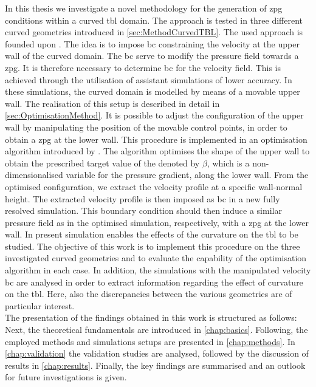 In this thesis we investigate a  novel methodology for the generation of \acrshort{zpg} conditions within a curved \acrshort{tbl} domain.
The approach is tested in three different curved geometries introduced in \autoref{sec:MethodCurvedTBL}.
The used approach is founded upon \citet{schlatter_leveraging_2025}.
The idea is to impose \acrlong{bc} constraining the velocity at the upper wall of the curved domain.  The \acrlong{bc}   serve to modify the pressure field towards a \acrlong{zpg}.
It is therefore necessary to determine \acrshort{bc} for the velocity field. 
This is achieved through the utilisation of assistant simulations of lower accuracy. 
In these simulations, the curved domain is modelled by means of a movable upper wall. 
The realisation of this setup is described in detail in \autoref{sec:OptimisationMethod}.
It is possible to adjust the configuration of the upper wall by manipulating the position of the movable control points,
 in order to obtain a \acrshort{zpg} at the lower wall.
This procedure is implemented in an optimisation algorithm introduced by \citet{morita_applying_2022}.
The algorithm optimises the shape of the upper wall to obtain the prescribed target value of the denoted by $\beta$, which is a non-dimensionalised variable for the pressure gradient, along the lower wall.
From the optimised configuration, we extract the velocity profile at a specific wall-normal height.
The extracted velocity profile is then imposed as \acrshort{bc} in a new fully resolved simulation.
This boundary condition should then induce a similar pressure field as in the optimised simulation, respectively, with a \acrlong{zpg} at the lower wall.
In present simulation enables the effects of the curvature on the \acrshort{tbl} to be studied.
The objective of this work is to implement this procedure on the three investigated curved geometries and to evaluate the capability of the optimisation algorithm in each case.
In addition, the simulations with the manipulated velocity \acrshort{bc} are analysed in order to extract information regarding the effect of curvature on the \acrshort{tbl}.
Here, also the discrepancies between the various geometries are of particular interest.\\

The presentation of the findings obtained in this work is structured as follows: 
Next, the theoretical fundamentals are introduced in \autoref{chap:basics}.
Following, the employed methods and simulations setups are presented in \autoref{chap:methods}.
In \autoref{chap:validation} the validation studies are analysed, followed by the discussion of results in \autoref{chap:results}.
Finally, the key findings are summarised and an outlook for future investigations is given.




